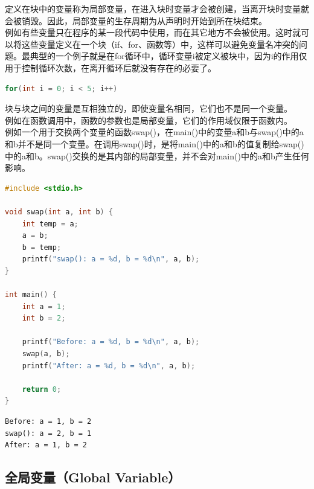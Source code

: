定义在块中的变量称为局部变量，在进入块时变量才会被创建，当离开块时变量就会被销毁。因此，局部变量的生存周期为从声明时开始到所在块结束。\\

例如有些变量只在程序的某一段代码中使用，而在其它地方不会被使用。这时就可以将这些变量定义在一个块（if、for、函数等）中，这样可以避免变量名冲突的问题。最典型的一个例子就是在for循环中，循环变量i被定义被块中，因为i的作用仅用于控制循环次数，在离开循环后就没有存在的必要了。

\vspace{-0.5cm}

\begin{lstlisting}[language=C]
for(int i = 0; i < 5; i++)
\end{lstlisting}

块与块之间的变量是互相独立的，即使变量名相同，它们也不是同一个变量。\\

例如在函数调用中，函数的参数也是局部变量，它们的作用域仅限于函数内。\\

例如一个用于交换两个变量的函数swap()，在main()中的变量a和b与swap()中的a和b并不是同一个变量。在调用swap()时，是将main()中的a和b的值复制给swap()中的a和b。swap()交换的是其内部的局部变量，并不会对main()中的a和b产生任何影响。\\


\begin{lstlisting}[language=C]
#include <stdio.h>

void swap(int a, int b) {
	int temp = a;
	a = b;
	b = temp;
	printf("swap(): a = %d, b = %d\n", a, b);
}

int main() {
	int a = 1;
	int b = 2;

	printf("Before: a = %d, b = %d\n", a, b);
	swap(a, b);
	printf("After: a = %d, b = %d\n", a, b);

	return 0;
}
\end{lstlisting}

\begin{tcolorbox}
	\begin{verbatim}
Before: a = 1, b = 2
swap(): a = 2, b = 1
After: a = 1, b = 2
	\end{verbatim}
\end{tcolorbox}

\vspace{0.5cm}

\subsection{全局变量（Global Variable）}

